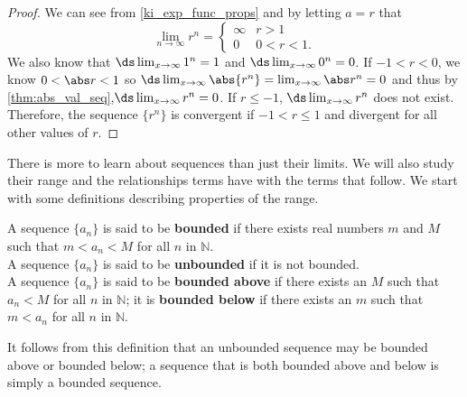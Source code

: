 

\begin{proof}
We can see from \autoref{ki_exp_func_props} and by letting $a=r$ that
\[
\lim_{n\to \infty} r^n =
\begin{cases}
\infty &  r>1\\
0 & 0<r<1.
\end{cases}
\]
We also know that $\ds  \lim_{x\to \infty} 1^n=1$ and $\ds  \lim_{x\to \infty} 0^n=0$. If $-1<r<0$, we know $0<\abs r<1$ so $\ds \lim_{x\to \infty}\abs{r^n}=\lim_{x\to \infty}\abs r^n=0$ and thus by \autoref{thm:abs_val_seq},$\ds \lim_{x\to \infty} r^n=0$. If $r\le-1$, $\ds \lim_{x\to \infty} r^n$ does not exist. Therefore, the sequence $\{ r^n\}$ is convergent if $-1<r\leq 1$ and divergent for all other values of $r$.
\end{proof}

There is more to learn about sequences than just their limits. We will also study their range and the relationships terms have with the terms that follow. We start with some definitions describing properties of the range.

{A sequence $\{a_n\}$ is said to be \textbf{bounded} if there exists real numbers $m$ and $M$ such that $m < a_n < M$ for all $n$ in $\mathbb{N}$.\\

A sequence $\{a_n\}$ is said to be \textbf{unbounded} if it is not bounded.\\

A sequence $\{a_n\}$ is said to be \textbf{bounded above} if there exists an $M$ such that $a_n < M$ for all $n$ in $\mathbb{N}$; it is \textbf{bounded below} if there exists an $m$ such that $m<a_n$ for all $n$ in $\mathbb{N}$.
}

It follows from this definition that an unbounded sequence may be bounded above or bounded below; a sequence that is both bounded above and below is simply a bounded sequence.

